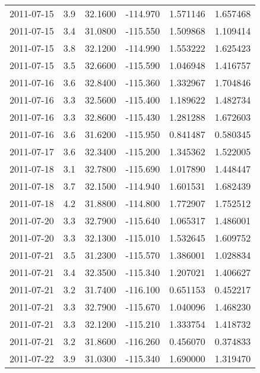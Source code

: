 \begin{tabular}{lrrrrr}
2011-07-15 &       3.9 &  32.1600 &  -114.970 &         1.571146 &         1.657468 \\
2011-07-15 &       3.4 &  31.0800 &  -115.550 &         1.509868 &         1.109414 \\
2011-07-15 &       3.8 &  32.1200 &  -114.990 &         1.553222 &         1.625423 \\
2011-07-15 &       3.5 &  32.6600 &  -115.590 &         1.046948 &         1.416757 \\
2011-07-16 &       3.6 &  32.8400 &  -115.360 &         1.332967 &         1.704846 \\
2011-07-16 &       3.3 &  32.5600 &  -115.400 &         1.189622 &         1.482734 \\
2011-07-16 &       3.3 &  32.8600 &  -115.430 &         1.281288 &         1.672603 \\
2011-07-16 &       3.6 &  31.6200 &  -115.950 &         0.841487 &         0.580345 \\
2011-07-17 &       3.6 &  32.3400 &  -115.200 &         1.345362 &         1.522005 \\
2011-07-18 &       3.1 &  32.7800 &  -115.690 &         1.017890 &         1.448447 \\
2011-07-18 &       3.7 &  32.1500 &  -114.940 &         1.601531 &         1.682439 \\
2011-07-18 &       4.2 &  31.8800 &  -114.800 &         1.772907 &         1.752512 \\
2011-07-20 &       3.3 &  32.7900 &  -115.640 &         1.065317 &         1.486001 \\
2011-07-20 &       3.3 &  32.1300 &  -115.010 &         1.532645 &         1.609752 \\
2011-07-21 &       3.5 &  31.2300 &  -115.570 &         1.386001 &         1.028834 \\
2011-07-21 &       3.4 &  32.3500 &  -115.340 &         1.207021 &         1.406627 \\
2011-07-21 &       3.2 &  31.7400 &  -116.100 &         0.651153 &         0.452217 \\
2011-07-21 &       3.3 &  32.7900 &  -115.670 &         1.040096 &         1.468230 \\
2011-07-21 &       3.3 &  32.1200 &  -115.210 &         1.333754 &         1.418732 \\
2011-07-21 &       3.2 &  31.8600 &  -116.260 &         0.456070 &         0.374833 \\
2011-07-22 &       3.9 &  31.0300 &  -115.340 &         1.690000 &         1.319470 \\

\end{tabular}
